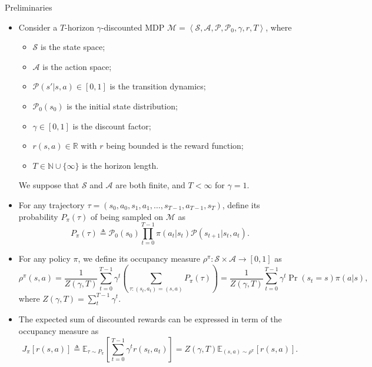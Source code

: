 \documentclass[10pt,aspectratio=169]{beamer}
\begin{document}
\begin{frame}{Preliminaries}
	\begin{itemize}
		\item Consider a $T$-horizon $\gamma$-discounted MDP $\mathcal{M} = \left \langle \mathcal{S}, \mathcal{A}, \mathcal{P}, \mathcal{P}_0, \gamma, r, T \right \rangle$, where
		      \begin{itemize}
			      \item $\mathcal{S}$ is the state space;
			      \item $\mathcal{A}$ is the action space;
			      \item $\mathcal{P}(s'|s,a) \in [0, 1]$ is the transition dynamics;
			      \item $\mathcal{P}_0(s_0)$ is the initial state distribution;
			      \item $\gamma \in [0,1]$ is the discount factor;
			      \item $r(s,a) \in \mathbb{R}$ with $r$ being bounded is the reward function;
			      \item $T \in \mathbb{N} \cup \{\infty\}$ is the horizon length.
		      \end{itemize}
		      We suppose that $\mathcal{S}$ and $\mathcal{A}$ are both finite, and $T<\infty$ for $\gamma = 1$.
		\item For any trajectory $\tau = (s_0, a_0, s_1, a_1, \ldots, s_{T-1}, a_{T-1}, s_T)$, define its probability $P_\pi(\tau)$ of being sampled on $\mathcal{M}$ as
		      \[
			      P_\pi(\tau) \triangleq \mathcal{P}_0(s_0)\prod_{t=0}^{T-1}\pi(a_t|s_t)\mathcal{P}(s_{t+1}| s_t, a_t).
		      \]
		\item For any policy $\pi$, we define its occupancy measure $\rho^\pi: \mathcal{S} \times \mathcal{A} \to [0, 1]$ as
		      \[
			      \rho^\pi(s, a) 
				  = \frac{1}{Z(\gamma, T)}\sum_{t=0}^{T-1} \gamma^t \left(\sum_{\tau:(s_t,a_t) = (s,a)} P_\pi(\tau)\right)
				  = \frac{1}{Z(\gamma, T)}\sum_{t=0}^{T-1} \gamma^t \Pr(s_t=s)\pi(a|s),
		      \]
		      where $Z(\gamma, T) = \sum_t^{T-1}\gamma^t$.
		\item The expected sum of discounted rewards can be expressed in term of the occupancy measure as
		      \[
			      J_\pi[r(s,a)] \triangleq \mathbb{E}_{\tau \sim P_\pi}\left[\sum_{t=0}^{T-1}\gamma^t r(s_t, a_t)\right] = Z(\gamma, T)\mathbb{E}_{(s, a) \sim \rho^\pi}[r(s,a)].
		      \]

\end{itemize}
\end{frame}
\end{document}
